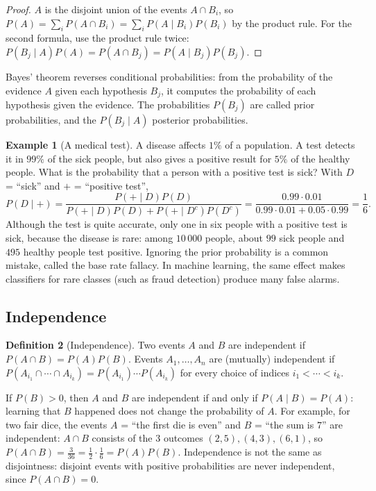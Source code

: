 \documentclass[11pt]{article}
\theoremstyle{definition}
\newtheorem{definition}{Definition}[section]
\newtheorem{example}[definition]{Example}
\theoremstyle{plain}
\theoremstyle{remark}
\begin{document}
\begin{proof}
    $A$ is the disjoint union of the events $A \cap B_i$, so $P(A) = \sum_i P(A \cap B_i) = \sum_i P(A \mid B_i)P(B_i)$ by the product rule. For the second formula, use the product rule twice: $P(B_j \mid A)P(A) = P(A \cap B_j) = P(A \mid B_j)P(B_j)$.
\end{proof}

Bayes' theorem reverses conditional probabilities: from the probability of the evidence $A$ given each hypothesis $B_j$, it computes the probability of each hypothesis given the evidence. The probabilities $P(B_j)$ are called prior probabilities, and the $P(B_j \mid A)$ posterior probabilities.

\begin{example}[A medical test]\label{ex:medical}
    A disease affects $1\%$ of a population. A test detects it in $99\%$ of the sick people, but also gives a positive result for $5\%$ of the healthy people. What is the probability that a person with a positive test is sick? With $D$ = ``sick'' and $+$ = ``positive test'',
    \[P(D \mid +) = \frac{P(+ \mid D)P(D)}{P(+ \mid D)P(D) + P(+ \mid D^c)P(D^c)} = \frac{0.99 \cdot 0.01}{0.99 \cdot 0.01 + 0.05 \cdot 0.99} = \frac{1}{6}.\]
    Although the test is quite accurate, only one in six people with a positive test is sick, because the disease is rare: among $10\,000$ people, about $99$ sick people and $495$ healthy people test positive. Ignoring the prior probability is a common mistake, called the base rate fallacy. In machine learning, the same effect makes classifiers for rare classes (such as fraud detection) produce many false alarms.
\end{example}

\subsection{Independence}

\begin{definition}[Independence]\label{def:independence}
    Two events $A$ and $B$ are independent if $P(A \cap B) = P(A)P(B)$. Events $A_1, \ldots, A_n$ are (mutually) independent if $P(A_{i_1} \cap \cdots \cap A_{i_k}) = P(A_{i_1}) \cdots P(A_{i_k})$ for every choice of indices $i_1 < \cdots < i_k$.
\end{definition}

If $P(B) > 0$, then $A$ and $B$ are independent if and only if $P(A \mid B) = P(A)$: learning that $B$ happened does not change the probability of $A$. For example, for two fair dice, the events $A$ = ``the first die is even'' and $B$ = ``the sum is $7$'' are independent: $A \cap B$ consists of the $3$ outcomes $(2, 5), (4, 3), (6, 1)$, so $P(A \cap B) = \frac{3}{36} = \frac{1}{2} \cdot \frac{1}{6} = P(A)P(B)$. Independence is not the same as disjointness: disjoint events with positive probabilities are never independent, since $P(A \cap B) = 0$.
\end{document}
